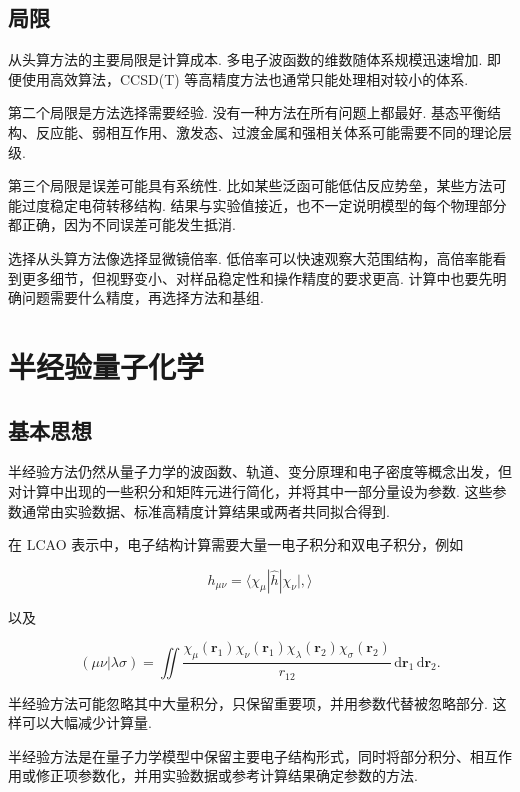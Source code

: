 \documentclass[UTF8,11pt,a4paper,openany]{ctexbook}
\newcommand{\braket}[2]{\langle #1\mid #2\rangle}\newcommand{\ii}{\mathrm i}
\newcommand{\dd}{\,\mathrm d}\newcommand{\Ham}{\hat H}\newcommand{\tr}{\operatorname{Tr}}
\begin{document}
\subsection{局限}

从头算方法的主要局限是计算成本. 多电子波函数的维数随体系规模迅速增加. 即便使用高效算法，CCSD(T) 等高精度方法也通常只能处理相对较小的体系. 

第二个局限是方法选择需要经验. 没有一种方法在所有问题上都最好. 基态平衡结构、反应能、弱相互作用、激发态、过渡金属和强相关体系可能需要不同的理论层级. 

第三个局限是误差可能具有系统性. 比如某些泛函可能低估反应势垒，某些方法可能过度稳定电荷转移结构. 结果与实验值接近，也不一定说明模型的每个物理部分都正确，因为不同误差可能发生抵消. 

\begin{analogybox}
选择从头算方法像选择显微镜倍率. 低倍率可以快速观察大范围结构，高倍率能看到更多细节，但视野变小、对样品稳定性和操作精度的要求更高. 计算中也要先明确问题需要什么精度，再选择方法和基组. 
\end{analogybox}

\section{半经验量子化学}

\subsection{基本思想}

半经验方法仍然从量子力学的波函数、轨道、变分原理和电子密度等概念出发，但对计算中出现的一些积分和矩阵元进行简化，并将其中一部分量设为参数. 这些参数通常由实验数据、标准高精度计算结果或两者共同拟合得到. 

在 LCAO 表示中，电子结构计算需要大量一电子积分和双电子积分，例如

\[
h_{\mu\nu}
=
\braket{\chi_\mu|\hat h|\chi_\nu},
\]

以及

\[
(\mu\nu|\lambda\sigma)
=
\iint
\frac{
\chi_\mu(\mathbf r_1)
\chi_\nu(\mathbf r_1)
\chi_\lambda(\mathbf r_2)
\chi_\sigma(\mathbf r_2)
}{
r_{12}
}
\dd\mathbf r_1\dd\mathbf r_2.
\]

半经验方法可能忽略其中大量积分，只保留重要项，并用参数代替被忽略部分. 这样可以大幅减少计算量. 

\begin{definitionbox}
半经验方法是在量子力学模型中保留主要电子结构形式，同时将部分积分、相互作用或修正项参数化，并用实验数据或参考计算结果确定参数的方法. 
\end{definitionbox}
\end{document}
